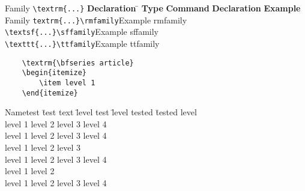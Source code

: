 \newcommand{\header}[1]{\textbf{#1}}

\begin{tabbing}
    Family \= \verb|\textrm{...}| \=\header{Declaration} \= \kill
    \header{Type}\> \header{Command} \> \header{Declaration} \> \header{Example}\\
    Family \>\verb|textrm{...}|\>\verb|\rmfamily|\>\rmfamily Example rmfamily \\
    \>\verb|\textsf{...}|\>\verb|\sffamily|\>\sffamily Example sffamily\\
    \>\verb|\texttt{...}|\>\verb|\ttfamily|\>\ttfamily Example ttfamily
\end{tabbing}

\begin{verbatim}
    \textrm{\bfseries article}
    \begin{itemize}
        \item level 1
    \end{itemize}
\end{verbatim}

\begin{tabbing}
    
    Nametest \= test text \= level test \= level tested \= tested level\\
    \> level 1 \> level 2 \> level 3 \> level 4 \\
    \> level 1 \> level 2 \> level 3 \> level 4 \+\\
    \> level 1 \> level 2 \> level 3 \- \\%
    \> level 1 \> level 2 \> level 3 \> level 4 \+\+\\
    \> level 1 \> level 2 \\%
    \< level 1 \> level 2 \> level 3 \> level 4 \\
\end{tabbing}
